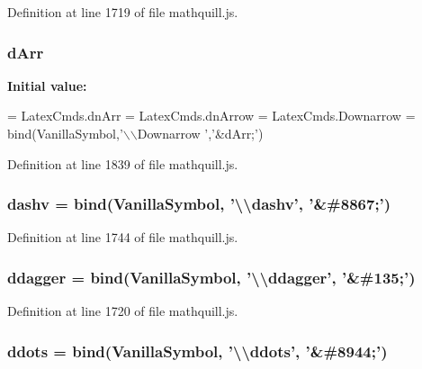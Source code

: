 Definition at line 1719 of file mathquill.\-js.

\subsubsection[{d\-Arr}]{ d\-Arr}\label{mathquill_8js_a581ba2ab8397b62983e5860ad049a6b0}
{\bfseries Initial value\-:}
\begin{DoxyCode}
= LatexCmds.dnArr = LatexCmds.dnArrow = LatexCmds.Downarrow =
  bind(VanillaSymbol,\textcolor{stringliteral}{'\(\backslash\)\(\backslash\)Downarrow '},\textcolor{stringliteral}{'&dArr;'})
\end{DoxyCode}


Definition at line 1839 of file mathquill.\-js.

\subsubsection[{dashv}]{ dashv = {\bf bind}({\bf Vanilla\-Symbol}, '\textbackslash{}\textbackslash{}dashv', '\&\#8867;')}\label{mathquill_8js_abfd7a1914cbbdc45bff5f657526eeeb8}


Definition at line 1744 of file mathquill.\-js.

\subsubsection[{ddagger}]{ ddagger = {\bf bind}({\bf Vanilla\-Symbol}, '\textbackslash{}\textbackslash{}ddagger', '\&\#135;')}\label{mathquill_8js_aa8ba6138e37e62d8f4e48a750ce9669d}


Definition at line 1720 of file mathquill.\-js.

\subsubsection[{ddots}]{ ddots = {\bf bind}({\bf Vanilla\-Symbol}, '\textbackslash{}\textbackslash{}ddots', '\&\#8944;')}\label{mathquill_8js_a086f4ae921b7c8cb55c1dcbce3d1dd2a}


